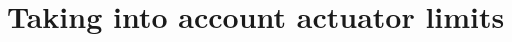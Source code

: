 \documentclass{article}
\begin{document}
\section{Taking into account actuator limits}

\clearpage

\printbibliography
\cleardoublepage

\end{document}
